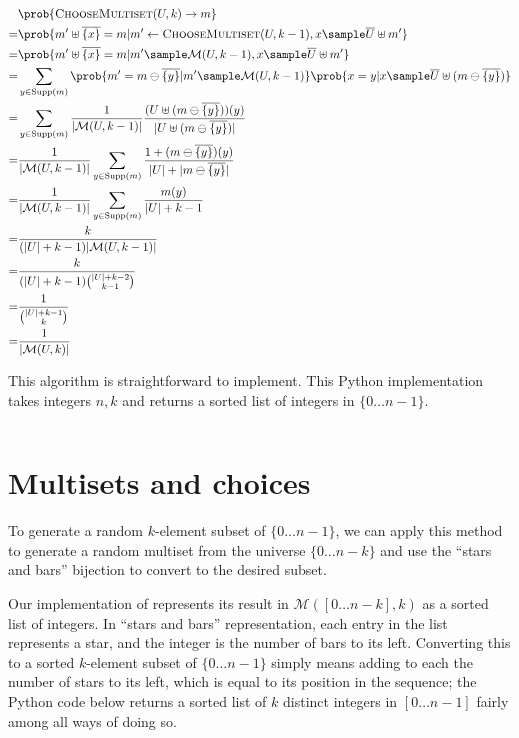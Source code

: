 \documentclass[letterpaper,luatex,11pt]{article}
\DeclareMathOperator{\Supp}{Supp}
\begin{document}
\begin{align*}
    &\prob{\textproc{ChooseMultiset}(U, k) \rightarrow m}
    \\
    =&
    \prob{m' \uplus \overline{\{x\}} = m
        | m' \leftarrow \textproc{ChooseMultiset}(U, k-1), x \sample \overline{U} \uplus m'}
    \\
    =&
    \prob{m' \uplus \overline{\{x\}} = m
        | m' \sample \mathcal{M}(U, k-1), x \sample \overline{U} \uplus m'}
    \\
    =&
    \sum_{y \in \Supp(m)}
    \prob{m' = m \ominus \overline{\{y\}} | m' \sample \mathcal{M}(U, k-1)}
    \prob{x = y | x \sample \overline{U} \uplus (m \ominus \overline{\{y\}})}
    \\
    =&
    \sum_{y \in \Supp(m)}
    \frac{1}{|\mathcal{M}(U, k-1)|}
    \frac{(U \uplus (m \ominus \overline{\{y\}}))(y)}{|U \uplus (m \ominus \overline{\{y\}})|}
    \\
    =&
    \frac{1}{|\mathcal{M}(U, k-1)|}
    \sum_{y \in \Supp(m)}
    \frac{1 + (m \ominus \overline{\{y\}})(y)}{|U| + |m \ominus \overline{\{y\}}|}
    \\
    =&
    \frac{1}{|\mathcal{M}(U, k-1)|}
    \sum_{y \in \Supp(m)}
    \frac{m(y)}{|U| + k -1}
    \\
    =& \frac{k}{(|U| + k -1)|\mathcal{M}(U, k-1)|}
    \\
    =& \frac{k}{(|U| + k -1)\binom{|U| + k - 2}{k-1}}
    \\
    =& \frac{1}{\binom{|U| + k - 1}{k}}
    \\
    =& \frac{1}{|\mathcal{M}(U, k)|}
\end{align*}

This algorithm is straightforward to implement. This Python implementation takes integers
$n, k$ and returns a sorted list of integers in $\{0 \ldots n-1\}$.

\inputminted{Python}{choose_multiset.py}

\section{Multisets and choices}


To generate a random \(k\)-element subset of \(\{0 \ldots n-1\}\),
we can apply this method to generate a random multiset from the universe \(\{0 \ldots n-k\}\)
and use the ``stars and bars'' bijection to convert to the desired subset.

Our implementation of 
represents its result in $\mathcal{M}([0 \ldots n-k], k)$ as a sorted list of integers.
In ``stars and bars'' representation,
each entry in the list represents a star, and the integer is the number of bars to its left.
Converting this to a sorted \(k\)-element subset of \(\{0 \ldots n-1\}\) simply means adding to each
the number of stars to its left, which is equal to its position in the sequence; the Python code
below returns a sorted list of $k$ distinct integers in $[0 \ldots n-1]$ fairly among all ways
of doing so.

\inputminted{Python}{choose_binom.py}

\printbibliography
\end{document}
